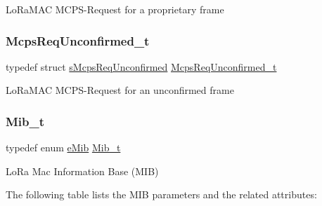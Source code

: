 Lo\+Ra\+M\+AC M\+C\+P\+S-\/\+Request for a proprietary frame \mbox{\label{group__LORAMAC_gaab871b914dfa4013c176586dcc2ea6df}} 
\subsubsection{\texorpdfstring{Mcps\+Req\+Unconfirmed\+\_\+t}{McpsReqUnconfirmed\_t}}
{\footnotesize\ttfamily typedef struct \hyperlink{structsMcpsReqUnconfirmed}{s\+Mcps\+Req\+Unconfirmed} \hyperlink{group__LORAMAC_gaab871b914dfa4013c176586dcc2ea6df}{Mcps\+Req\+Unconfirmed\+\_\+t}}

Lo\+Ra\+M\+AC M\+C\+P\+S-\/\+Request for an unconfirmed frame \mbox{\label{group__LORAMAC_gaf17bd3de9ec75e4954be9a070cd8ddf9}} 
\subsubsection{\texorpdfstring{Mib\+\_\+t}{Mib\_t}}
{\footnotesize\ttfamily typedef enum \hyperlink{group__LORAMAC_ga32ea83d13a3f5bb4b3ec2ace2319ab61}{e\+Mib} \hyperlink{group__LORAMAC_gaf17bd3de9ec75e4954be9a070cd8ddf9}{Mib\+\_\+t}}

Lo\+Ra Mac Information Base (M\+IB)

The following table lists the M\+IB parameters and the related attributes\+:

